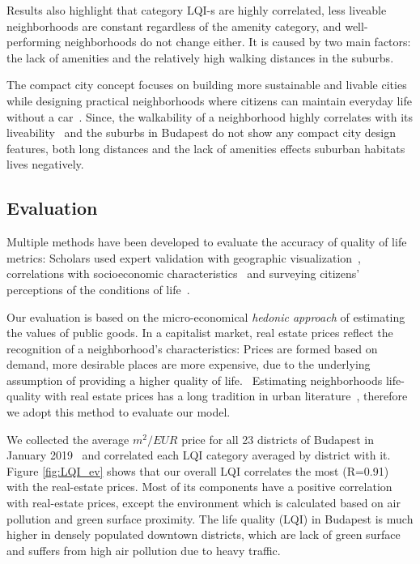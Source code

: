 Results also highlight that category LQI-s are highly correlated, less liveable neighborhoods are constant regardless of the amenity category, and well-performing neighborhoods do not change either. It is caused by two main factors: the lack of amenities and the relatively high walking distances in the suburbs.

The compact city concept focuses on building more sustainable and livable cities while designing practical neighborhoods where citizens can maintain everyday life without a car~\cite{Dittmar2012New}. Since, the walkability of a neighborhood highly correlates with its liveability~\cite{Rogers2011Examining} and the suburbs in Budapest do not show any compact city design features, both long distances and the lack of amenities effects suburban habitats lives negatively.

\subsection{Evaluation}

Multiple methods have been developed to evaluate the accuracy of quality of life metrics: Scholars used expert validation with geographic visualization~\cite{Rinner2007Geographic,Gavrilidis2016Urban}, correlations with socioeconomic characteristics~\cite{Talen2002Pedestrian} and surveying citizens’ perceptions of the conditions of life~\cite{Santos2007Monitoring}.

Our evaluation is based on the micro-economical {\it hedonic approach} of estimating the values of public goods. In a capitalist market, real estate prices reflect the recognition of a neighborhood's characteristics: Prices are formed based on demand, more desirable places are more expensive, due to the underlying assumption of providing a higher quality of life.~\cite{Brueckner1999Central} Estimating neighborhoods life-quality with real estate prices has a long tradition in urban literature~\cite{Roback1982Wages,Blomquist1988New,Lora2011New}, therefore we adopt this method to evaluate our model.

We collected the average $m^{2}/EUR$ price for all 23 districts of Budapest in January 2019~\cite{HU2019RealEstate} and correlated each LQI category averaged by district with it. Figure \ref{fig:LQI_ev} shows that our overall LQI correlates the most (R=0.91) with the real-estate prices. Most of its components have a positive correlation with real-estate prices, except the environment which is calculated based on air pollution and green surface proximity. The life quality (LQI) in Budapest is much higher in densely populated downtown districts, which are lack of green surface and suffers from high air pollution due to heavy traffic.

